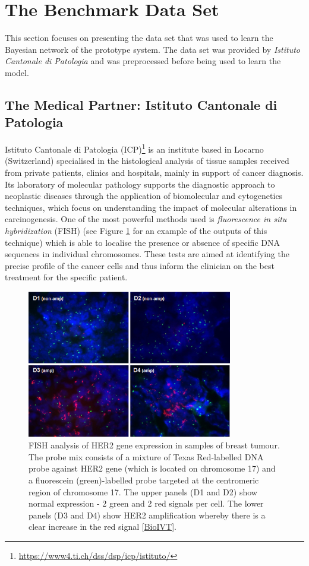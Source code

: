 \section{The Benchmark Data Set} \label{sec:data-set}
This section focuses on presenting the data set that was used to learn the Bayesian network of the prototype system.
The data set was provided by \textit{Istituto Cantonale di Patologia} and was preprocessed before being used to learn the model.

\subsection{The Medical Partner: Istituto Cantonale di Patologia} \label{subsec:istituto-cantonale}
Istituto Cantonale di Patologia (ICP)\footnote{\url{https://www4.ti.ch/dss/dsp/icp/istituto/}} is an institute based in Locarno (Switzerland) specialised in the histological analysis of tissue samples received from private patients, clinics and hospitals, mainly in support of cancer diagnosis.
Its laboratory of molecular pathology supports the diagnostic approach to neoplastic diseases through the application of biomolecular and cytogenetics techniques, which focus on understanding the impact of molecular alterations in carcinogenesis.
One of the most powerful methods used is \textit{fluorescence in situ hybridization} (FISH) (see Figure \ref{fig:fish-picture} for an example of the outputs of this technique) which is able to localise the presence or absence of specific DNA sequences in individual chromosomes.
These tests are aimed at identifying the precise profile of the cancer cells and thus inform the clinician on the best treatment for the specific patient.

\begin{figure}[htbp]
\centerline{\includegraphics[width=0.8\textwidth]{methodology/images/fish-picture}}
\caption{FISH analysis of HER2 gene expression in samples of breast tumour. The probe mix consists of a mixture of Texas Red-labelled DNA probe against HER2 gene (which is located on chromosome 17) and a fluorescein (green)-labelled probe targeted at the centromeric region of chromosome 17. The upper panels (D1 and D2) show normal expression - 2 green and 2 red signals per cell. The lower panels (D3 and D4) show HER2 amplification whereby there is a clear increase in the red signal [\href{https://www.bioivt.com/fluorescent-in-situ-hybridisation-fish/}{BioIVT}].}
\label{fig:fish-picture}
\end{figure}

